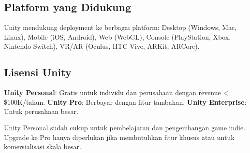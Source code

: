 \subsection{Platform yang Didukung}

Unity mendukung deployment ke berbagai platform: Desktop (Windows, Mac, Linux), Mobile (iOS, Android), Web (WebGL), Console (PlayStation, Xbox, Nintendo Switch), VR/AR (Oculus, HTC Vive, ARKit, ARCore).

\subsection{Lisensi Unity}

\textbf{Unity Personal}: Gratis untuk individu dan perusahaan dengan revenue < \$100K/tahun. \textbf{Unity Pro}: Berbayar dengan fitur tambahan. \textbf{Unity Enterprise}: Untuk perusahaan besar.

\begin{catatan}
Unity Personal sudah cukup untuk pembelajaran dan pengembangan game indie. Upgrade ke Pro hanya diperlukan jika membutuhkan fitur khusus atau untuk komersialisasi skala besar.
\end{catatan}
